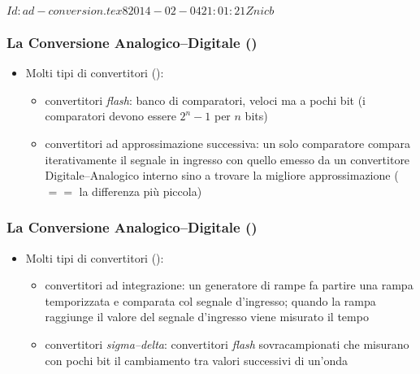 %
%
\svnInfo $Id: ad-conversion.tex 8 2014-02-04 21:01:21Z nicb $

\setcounter{ms}{0}
\begin{frame}
    \frametitle{La Conversione Analogico--Digitale ()}

    \begin{itemize}[<+- | alert@+->]
        \item Molti tipi di convertitori ():

            \begin{itemize}[<+- | alert@+->]
                \item convertitori \emph{flash}: banco di comparatori, veloci
                    ma a pochi bit (i comparatori devono essere $2^n - 1$ per $n$ bits)
                \item{convertitori ad approssimazione successiva: un solo
                    comparatore compara iterativamente il segnale in ingresso con quello
                    emesso da un convertitore Digitale--Analogico interno sino
                    a trovare la migliore approssimazione ($==$ la differenza
                    pi\`u piccola)}
            \end{itemize}

    \end{itemize}

\end{frame}

\begin{frame}
    \frametitle{La Conversione Analogico--Digitale ()}

    \begin{itemize}[<+- | alert@+->]
        \item Molti tipi di convertitori ():

            \begin{itemize}[<+- | alert@+->]

                \item{convertitori ad integrazione: un generatore di rampe fa
                    partire una rampa temporizzata e comparata col segnale
                    d'ingresso; quando la rampa raggiunge
                    il valore del segnale d'ingresso
                    viene misurato il tempo}

                \item{convertitori \emph{sigma--delta}: convertitori
                    \emph{flash} sovracampionati che misurano con pochi bit il cambiamento
                    tra valori successivi di un'onda}

            \end{itemize}

    \end{itemize}

\end{frame}

